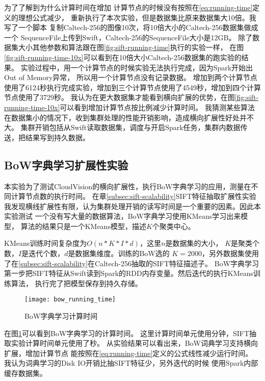 为了了解到为什么计算时间在增加
计算节点的时候没有按照在\ref{eq:running-time}定义的理想公式减少，
重新执行了本次实验，但是数据集比原来数据集大10倍。我写了一个脚本
复制Caltech-256的图像10次，将10倍大小的Caltech-256数据集做成一个
SequenceFile上传到Swift，Caltech-256的SequenceFile大小是12GB。
除了数据集大小其他参数和算法跟在图\ref{fig:sift-running-time}执行的实验一样，
在图\ref{fig:sift-running-time-10x}可以看到在10倍大小Caltech-256数据集的跑实验的结果。
实验过程中，用一个计算节点的时候实验无法执行完成，因为Spark开始出Out of Memory异常，
所以用一个计算节点没有记录数据。
增加到两个计算节点使用了6124秒执行完成实验，增加到三个计算节点使用了4549秒，增加到四个计算节点使用了3729秒。
我认为在更大数据集才能看到横向扩展的优势，在图\ref{fig:sift-running-time-10x}可以看到增加计算节点按比例减少计算时间。
我猜测某些算法在数据集小的情况下，收到集群处理的性能开销影响，造成横向扩展性好处并不大。
集群开销包括从Swift读取数据集，调度与开启Spark任务，集群内数据传送，把结果写到持久数据。




\subsection{BoW字典学习扩展性实验}
\label{subsec:bow-learning-scalability}
本实验为了测试CloudVision的横向扩展性，执行BoW字典学习的应用，测量在不同计算节点数的执行时间。
在章\ref{subsec:sift-scalability}SIFT特征抽取扩展性实验
我发现横线扩展性有限，认为集群处理开销的读写时间是一个重要的因素。因此本实验测试
一个没有写大量的数据算法，BoW字典学习使用KMeans学习出来模型，
算法的结果只是一个KMeans模型，描述$K$个聚类中心。

KMeans训练时间复杂度为$O(n * K * I *d)$，这里$n$是数据集的大小，
$K$是聚类个数，$I$是迭代个数，$d$是数据集维度。训练的BoW选的
$K = 2000$，另外数据集使用了在\ref{subsec:sift-scalability}在Caltech-256抽取的SIFT特征描述子。
BoW字典学习第一步把SIFT特征从Swift读到Spark的RDD内存变量。然后迭代的执行KMeans训练算法，
执行完了把模型保存到持久存储。

\begin{figure}[h]
  \centering
    \texttt{[image: bow\_running\_time]}
  \caption{BoW字典学习计算时间}
  \label{fig:bow-running-time}
\end{figure}

在图\ref{fig:bow-running-time}可以看到BoW字典学习的计算时间。
这里计算时间单元使用分钟，SIFT抽取实验计算时间单元使用了秒。
从实验结果可以看出来，BoW词典学习支持横向扩展，增加计算节点
能按照在\ref{eq:running-time}定义的公式线性减少运行时间。
我认为词典学习的Disk IO开销比抽SIFT特征少，另外迭代的时候
使用Spark内部缓存数据集。

